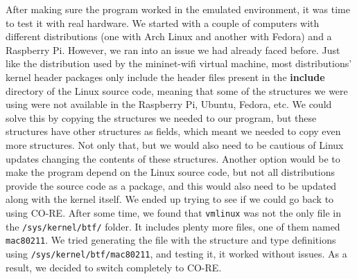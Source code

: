 After making sure the program worked in the emulated environment, it was time to
test it with real hardware. We started with a couple of computers with different
distributions (one with Arch Linux and another with Fedora) and a Raspberry Pi.
However, we ran into an issue we had already faced before. Just like the
distribution used by the mininet-wifi virtual machine, most distributions'
kernel header packages only include the header files present in the
\textbf{include} directory of the Linux source code, meaning that some of the
structures we were using were not available in the Raspberry Pi, Ubuntu, Fedora,
etc. We could solve this by copying the structures we needed to our program, but
these structures have other structures as fields, which meant we needed to copy
even more structures. Not only that, but we would also need to be cautious of
Linux updates changing the contents of these structures. Another option would be
to make the program depend on the Linux source code, but not all distributions
provide the source code as a package, and this would also need to be updated
along with the kernel itself. We ended up trying to see if we could go back to
using \ac{CO-RE}. After some time, we found that \texttt{vmlinux} was not the
only file in the \texttt{/sys/kernel/btf/} folder. It includes plenty more
files, one of them named \texttt{mac80211}. We tried generating the file with
the structure and type definitions using \texttt{/sys/kernel/btf/mac80211}, and
testing it, it worked without issues. As a result, we decided to switch
completely to \ac{CO-RE}.

